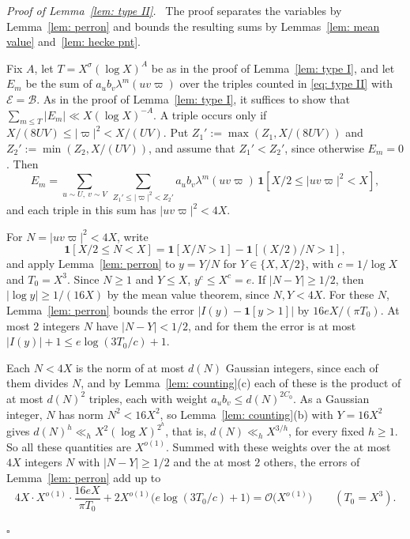 \documentclass{article}
\numberwithin{equation}{section}
\newenvironment{proof}[1][Proof]{\par\medskip\noindent\textit{#1.}\ }{\hfill$\square$\par\medskip}
\newcommand{\Le}{\leqslant}
\newcommand{\Ge}{\geqslant}
\begin{document}
\begin{proof}[Proof of Lemma~\ref{lem: type II}]
The proof separates the variables by Lemma~\ref{lem: perron} and bounds the resulting sums by Lemmas~\ref{lem: mean value} and~\ref{lem: hecke pnt}.

Fix $A$, let $T = X^{\sigma} (\log X)^A$ be as in the proof of Lemma~\ref{lem: type I}, and let $E_m$ be the sum of $a_u b_v \lambda^m(uv\varpi)$ over the triples counted in \eqref{eq: type II} with $\mathcal{E} = \mathcal{B}$. As in the proof of Lemma~\ref{lem: type I}, it suffices to show that $\sum_{m \Le T} |E_m| \ll X (\log X)^{-A}$. A triple occurs only if $X/(8UV) \Le |\varpi|^2 < X/(UV)$. Put $Z_1' := \max(Z_1, X/(8UV))$ and $Z_2' := \min(Z_2, X/(UV))$, and assume that $Z_1' < Z_2'$, since otherwise $E_m = 0$. Then
\begin{equation*}
E_m = \sum_{u \sim U,\ v \sim V}\ \sum_{Z_1' \Le |\varpi|^2 < Z_2'} a_u b_v \lambda^m(uv\varpi)\, \mathbf{1}[X/2 \Le |uv\varpi|^2 < X],
\end{equation*}
and each triple in this sum has $|uv\varpi|^2 < 4X$.

For $N = |uv\varpi|^2 < 4X$, write
\begin{equation*}
\mathbf{1}[X/2 \Le N < X] = \mathbf{1}[X/N > 1] - \mathbf{1}[(X/2)/N > 1],
\end{equation*}
and apply Lemma~\ref{lem: perron} to $y = Y/N$ for $Y \in \{X, X/2\}$, with $c = 1/\log X$ and $T_0 = X^3$. Since $N \Ge 1$ and $Y \Le X$, $y^c \Le X^c = e$. If $|N - Y| \Ge 1/2$, then $|\log y| \Ge 1/(16X)$ by the mean value theorem, since $N, Y < 4X$. For these $N$, Lemma~\ref{lem: perron} bounds the error $|I(y) - \mathbf{1}[y > 1]|$ by $16eX/(\pi T_0)$. At most $2$ integers $N$ have $|N - Y| < 1/2$, and for them the error is at most $|I(y)| + 1 \Le e \log(3T_0/c) + 1$.

Each $N < 4X$ is the norm of at most $d(N)$ Gaussian integers, since each of them divides $N$, and by Lemma~\ref{lem: counting}(c) each of these is the product of at most $d(N)^2$ triples, each with weight $a_u b_v \Le d(N)^{2C_0}$. As a Gaussian integer, $N$ has norm $N^2 < 16X^2$, so Lemma~\ref{lem: counting}(b) with $Y = 16X^2$ gives $d(N)^h \ll_h X^2 (\log X)^{2^h}$, that is, $d(N) \ll_h X^{3/h}$, for every fixed $h \Ge 1$. So all these quantities are $X^{o(1)}$. Summed with these weights over the at most $4X$ integers $N$ with $|N - Y| \Ge 1/2$ and the at most $2$ others, the errors of Lemma~\ref{lem: perron} add up to
\begin{equation*}
4X \cdot X^{o(1)} \cdot \frac{16eX}{\pi T_0} + 2X^{o(1)} \bigl( e \log(3T_0/c) + 1 \bigr) = \mathcal{O}\bigl( X^{o(1)} \bigr) \qquad (T_0 = X^3).
\end{equation*}


\end{proof}
\end{document}
